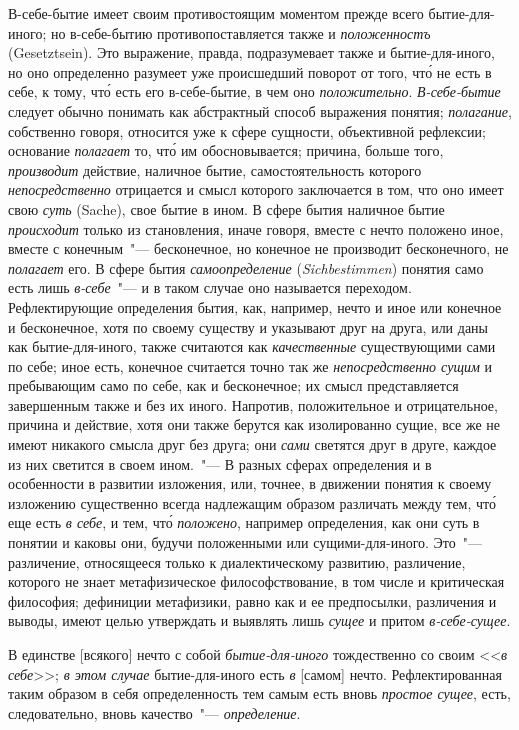 В-себе-бытие имеет своим противостоящим моментом
прежде всего бытие-для-иного; но в-себе-бытию противопоставляется
также и \emph{положенностъ} (Gesetztsein). Это
выражение, правда, подразумевает также и бытие-для-иного,
но оно определенно разумеет уже происшедший
поворот\endnotemark{} от того, чт\'о не есть в себе, к тому, чт\'о есть
его в-себе-бытие, в чем оно \emph{положительно}. \emph{В-себе-бытие}
следует обычно понимать как абстрактный способ выражения
понятия; \emph{полагание}, собственно говоря, относится
уже к сфере сущности, объективной рефлексии; основание
\emph{полагает} то, чт\'о им обосновывается; причина, больше того,
\emph{производит} действие, наличное бытие, самостоятельность
которого \emph{непосредственно} отрицается и смысл которого
заключается в том, что оно имеет свою \emph{суть} (Sache),
свое бытие в ином. В сфере бытия наличное бытие \emph{происходит}
только из становления, иначе говоря, вместе с
нечто положено иное, вместе с конечным~"--- бесконечное,
но конечное не производит бесконечного, не \emph{полагает} его.
В сфере бытия \emph{самоопределение} (\emph{Sichbestimmen}) понятия
само есть лишь \emph{в-себе}~"--- и в таком случае оно называется
переходом. Рефлектирующие определения бытия,
как, например, нечто и иное или конечное и бесконечное,
хотя по своему существу и указывают друг на друга,
или даны как бытие-для-иного, также считаются как
\emph{качественные} существующими сами по себе; иное есть,
конечное считается точно так же \emph{непосредственно сущим}
и пребывающим само по себе, как и бесконечное; их
смысл представляется завершенным также и без их иного.
Напротив, положительное и отрицательное, причина
и действие, хотя они также берутся как изолированно
сущие, все же не имеют никакого смысла друг без друга;
они \emph{сами} светятся друг в друге, каждое из них светится
в своем ином.~"--- В разных сферах определения и
в особенности в развитии изложения, или, точнее, в движении
понятия к своему изложению существенно всегда
надлежащим образом различать между тем, чт\'о еще есть
\emph{в себе}, и тем, чт\'о \emph{положено}, например определения, как
они суть в понятии и каковы они, будучи положенными
или сущими-для-иного. Это~"--- различение, относящееся
только к диалектическому развитию, различение, которого
не знает метафизическое философствование, в том
числе и критическая философия; дефиниции метафизики,
равно как и ее предпосылки, различения и выводы, имеют
целью утверждать и выявлять лишь \emph{сущее} и притом
\emph{в-себе-сущее}.


В единстве [всякого] нечто с собой \emph{бытие-для-иного}
тождественно со своим <<\emph{в себе}>>; \emph{в этом случае} бытие-для-иного
есть \emph{в} [самом] нечто. Рефлектированная таким
образом в себя определенность тем самым есть вновь
\emph{простое сущее}, есть, следовательно, вновь качество~"---
\emph{определение}.


